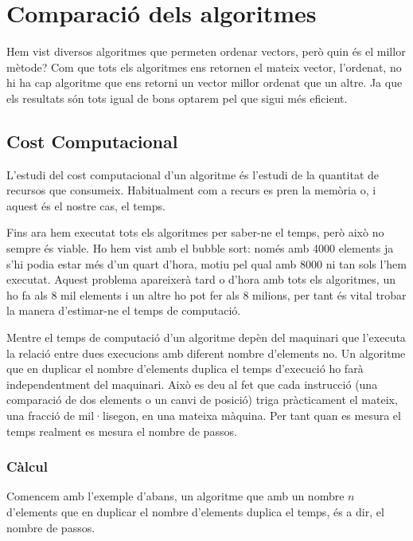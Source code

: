 \chapter{Comparació dels algoritmes}
Hem vist diversos algoritmes que permeten ordenar vectors, però quin és el millor mètode?
Com que tots els algoritmes ens retornen el mateix vector, l'ordenat, no hi ha cap algoritme que ens retorni un vector millor ordenat que un altre. Ja que els resultats són tots igual de bons optarem pel que sigui més eficient.

\section{Cost Computacional}
L'estudi del cost computacional d'un algoritme és l'estudi de la quantitat de recursos que consumeix. Habitualment com a recurs es pren la memòria o, i aquest és el nostre cas, el temps.

Fins ara hem executat tots els algoritmes per saber-ne el temps, però això no sempre és viable.
Ho hem vist amb el bubble sort: només amb 4000 elements ja s'hi podia estar més d'un quart d'hora, motiu pel qual amb 8000 ni tan sols l'hem executat.
Aquest problema apareixerà tard o d'hora amb tots els algoritmes, un ho fa als 8 mil elements i un altre ho pot fer als 8 milions, per tant és vital trobar la manera d'estimar-ne el temps de computació.

Mentre el temps de computació d'un algoritme depèn del maquinari que l'executa la relació entre dues execucions amb diferent nombre d'elements no.
Un algoritme que en duplicar el nombre d'elements duplica el temps d'execució ho farà independentment del maquinari.
Això es deu al fet que cada instrucció (una comparació de dos elements o un canvi de posició) triga pràcticament el mateix, una fracció de mil·lisegon, en una mateixa màquina. 
Per tant quan es mesura el temps realment es mesura el nombre de passos.

\subsection{Càlcul}
Comencem amb l'exemple d'abans, un algoritme que amb un nombre $n$ d'elements que en duplicar el nombre d'elements duplica el temps, és a dir, el nombre de passos.


